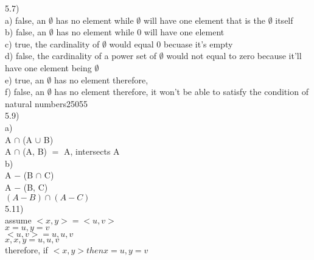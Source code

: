 \documentclass{article}
\begin{document}
\begin{spacing}{2}
\begin{center}
  5.7)\\
  a) false, an $\emptyset$ has no element while {$\emptyset$} will have one element that is the $\emptyset$ itself\\
  b) false, an $\emptyset$ has no element while {0} will have one element\\
  c) true, the cardinality of $\emptyset$ would equal 0 becuase it's empty\\
  d) false, the cardinality of a power set of $\emptyset$ would not equal to zero because it'll have one element being $\emptyset$\\
  e) true, an $\emptyset$ has no element therefore, {}\\
  f) false, an $\emptyset$ has no element therefore, it won't be able to satisfy the condition of natural numbers25055\\
  
  5.9)\\
  a)\\
  A $\cap$ (A $\cup$ B) \\
  A $\cap$ (A, B) $=$ A, intersects A\\
  b) \\
  A $-$ (B $\cap$ C)\\
  A $-$ (B, C)\\
  $(A-B) \cap (A-C)$\\
  5.11)\\
  assume $<x,y> = <u,v>$\\
  $x = u, y = v$\\
  $<u,v> = {u,{u,v}}$\\
  ${x,{x,y}} = {u, {u,v}}$\\
  therefore, if $<x,y> then x = u, y = v$\\
  
  \end{center}
\end{spacing}
\end{document}
